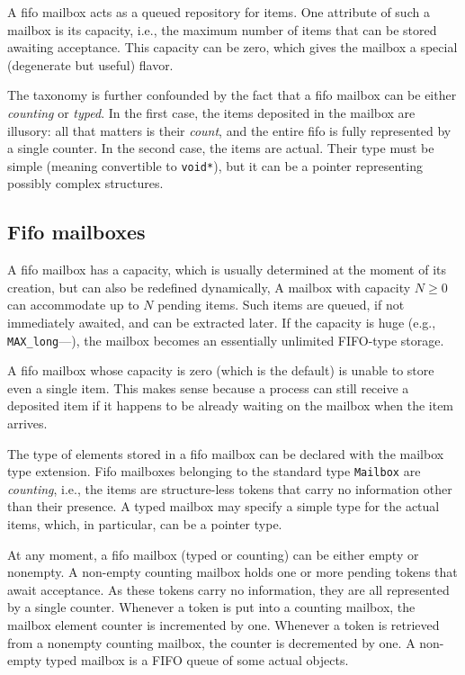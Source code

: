 A fifo mailbox acts as a queued repository for items.
One attribute of such a mailbox is its capacity, i.e., the maximum number
of items that can be stored awaiting acceptance.
This capacity can be zero, which gives the mailbox a special (degenerate but
useful) flavor.

The taxonomy is further confounded by the fact that a fifo mailbox can be
either {\em counting\/} or {\em typed}.
In the first case, the items deposited in the mailbox are illusory: all that
matters is their {\em count}, and the entire fifo is fully represented by a
single counter.
In the second case, the items are actual.
Their type must be simple (meaning convertible to {\tt void*}), but it can be a
pointer representing possibly complex structures.

\subsection{Fifo mailboxes}
\label{rm_mb_fi}

A fifo mailbox has a capacity, which is usually
determined at the moment of its creation, but can also be redefined
dynamically,
A mailbox with capacity $N \ge 0$
can accommodate up to $N$ pending items.
Such items are queued, if not immediately awaited, and can be extracted later.
If the capacity is huge (e.g., {\tt MAX\_long}---), the mailbox
becomes an essentially unlimited FIFO-type storage.

A fifo mailbox whose capacity is zero (which is the default)
is unable to store even a single item.
This makes sense because a process can still receive a deposited item if it
happens to be already waiting on the mailbox when the item arrives.

The type of elements stored in a fifo mailbox can be declared with the mailbox
type extension.
Fifo mailboxes belonging to the standard type {\tt Mailbox} are {\em counting},
i.e., the items are structure-less tokens
that carry no information other than their presence.
A typed mailbox may specify a simple type for the actual items, which,
in particular, can be a pointer type.

At any moment, a fifo mailbox (typed or counting) can be either empty or
nonempty.
A non-empty counting mailbox holds one or more pending
tokens that await acceptance.
As these tokens carry no information, they are all represented by a
single counter.
Whenever a token is put into a counting mailbox, the mailbox element counter
is incremented by one.
Whenever a token is retrieved from a nonempty counting mailbox, the counter
is decremented by one.
A non-empty typed mailbox is a FIFO queue of some actual objects.

